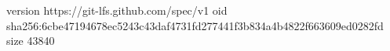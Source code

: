 version https://git-lfs.github.com/spec/v1
oid sha256:6cbe47194678ec5243c43daf4731fd277441f3b834a4b4822f663609ed0282fd
size 43840
